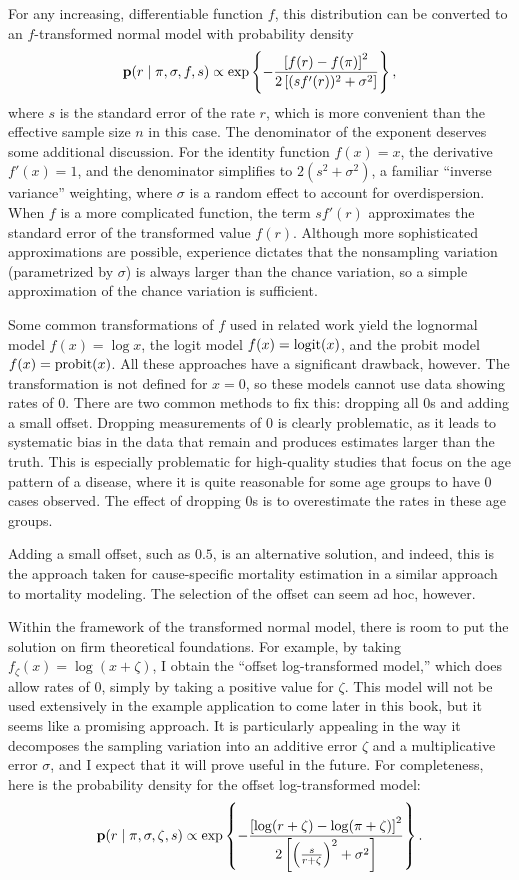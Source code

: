 For any increasing, differentiable function $f$, this distribution can
be converted to an $f$-transformed normal model with probability
density
\[
\mathbf{p}(r \;|\; \pi, \sigma, f, s) \propto
\exp\left\{-\frac{\left[f(r)-f(\pi)\right]^2}{2\left[(sf'(r))^2+\sigma^2\right]}\right\},
\]
where $s$ is the standard error of the rate $r$, which is more
convenient than the effective sample size $n$ in this case. The
denominator of the exponent deserves some additional discussion.  For
the identity function $f(x) = x$, the derivative $f'(x) = 1$, and the
denominator simplifies to $2(s^2 + \sigma^2)$, a familiar ``inverse
variance'' weighting, where $\sigma$ is a random effect to account for
overdispersion.  When $f$ is a more complicated function, the term
$sf'(r)$ approximates the standard error of the transformed value
$f(r)$.  Although more sophisticated approximations are possible,
experience dictates that the nonsampling variation (parametrized by
$\sigma$) is always larger than the chance variation, so a simple
approximation of the chance variation is sufficient.

Some common transformations of $f$ used in related work yield the
lognormal model $f(x) = \log x$, the logit model $f(x) = \operatorname{logit}(x)$,
and the probit model $f(x) = \operatorname{probit}(x)$.  All these approaches
have a significant drawback, however.  The transformation is not
defined for $x=0$, so these models cannot use data showing rates of
$0$. There are two common methods to fix this: dropping all $0$s
and adding a small offset.  Dropping measurements of $0$ is clearly
problematic, as it leads to systematic bias in the data that remain
and produces estimates larger than the truth.  This is especially
problematic for high-quality studies that focus on the age pattern of
a disease, where it is quite reasonable for some age groups to have
$0$ cases observed.  The effect of dropping $0$s is to overestimate
the rates in these age groups.

Adding a small offset, such as $0.5$, is an alternative solution,
and indeed, this is the approach taken for cause-specific mortality
estimation in a similar approach to mortality
modeling.\cite{girosi_demographic_2008} The selection of the offset
can seem ad hoc, however.

Within the framework of the transformed normal model, there is room to
put the solution on firm theoretical foundations.  For example, by
taking $f_\zeta(x) = \log(x + \zeta)$, I obtain the ``offset
log-transformed model,'' which does allow rates of $0$, simply by taking
a positive value for $\zeta$.  This model will not be used extensively
in the example application to come later in this book, but it seems
like a promising approach.  It is particularly appealing in the way it
decomposes the sampling variation into an additive error $\zeta$ and a
multiplicative error $\sigma$, and I expect that it will prove useful
in the future.  For completeness, here is the probability density for
the offset log-transformed model:
\[
\mathbf{p}(r\;|\; \pi, \sigma,\zeta, s)
\propto \exp\left\{
-\frac{\left[\log(r+\zeta)-\log(\pi+\zeta)\right]^2}
      {2\left[\left(\frac{s}{r+\zeta}\right)^2+\sigma^2\right]}
\right\}.
\]

